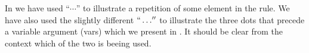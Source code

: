In  we have used ``$\cdots$'' to illustrate a repetition
of some element in the rule. We have also used the slightly different
$``\dots''$ to illustrate the three dots that precede a variable argument (vars)
which we present in . It should be clear from
the context which of the two is beeing used.

